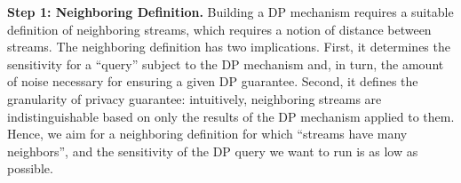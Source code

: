 \textbf{Step 1: Neighboring Definition.}
Building a DP mechanism requires a suitable definition of neighboring
streams, which requires a notion of distance between streams.
The neighboring definition has two implications. First, it
determines the sensitivity for a ``query'' subject to the DP mechanism and, in
turn, the amount of noise necessary for ensuring a given DP guarantee. Second,
it defines the granularity of privacy guarantee: intuitively, neighboring streams
are indistinguishable based on only the results of the DP mechanism applied to
them.
Hence, we aim for a neighboring definition for which ``streams have many
neighbors'', and the sensitivity of the DP query we want to run is as low as
possible.



